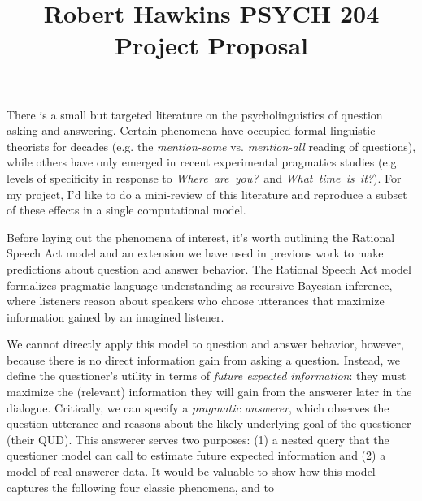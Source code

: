 \documentclass[12pt]{article}   	%
\title{\normalsize\vspace{-2.5cm}Robert Hawkins \hfill PSYCH 204 Project Proposal }
\date{\vspace{-2cm}}
\begin{document}
\maketitle

There is a small but targeted literature on the psycholinguistics of question asking and answering. Certain phenomena have occupied formal linguistic theorists for decades (e.g. the \emph{mention-some} vs. \emph{mention-all} reading of questions), while others have only emerged in recent experimental pragmatics studies (e.g. levels of specificity in response to \emph{Where~are~you?}~and \emph{What~time~is~it?}). For my project, I'd like to do a mini-review of this literature and reproduce a subset of these effects in a single computational model.

Before laying out the phenomena of interest, it's worth outlining the Rational Speech Act model and an extension we have used in previous work to make predictions about question and answer behavior. The Rational Speech Act model  formalizes pragmatic language understanding as recursive Bayesian inference, where listeners reason about speakers who choose utterances that maximize information gained by an imagined listener. 

We cannot directly apply this model to question and answer behavior, however, because there is no direct information gain from asking a question. Instead, we define the questioner's utility in terms of \emph{future expected information}: they must maximize the (relevant) information they will gain from the answerer later in the dialogue. Critically, we can specify a \emph{pragmatic answerer}, which observes the question utterance and reasons about the likely underlying goal of the questioner (their QUD). This answerer serves two purposes: (1) a nested query that the questioner model can call to estimate future expected information and (2) a model of real answerer data. It would be valuable to show  how this model captures the following four classic phenomena, and to 
\end{document}
